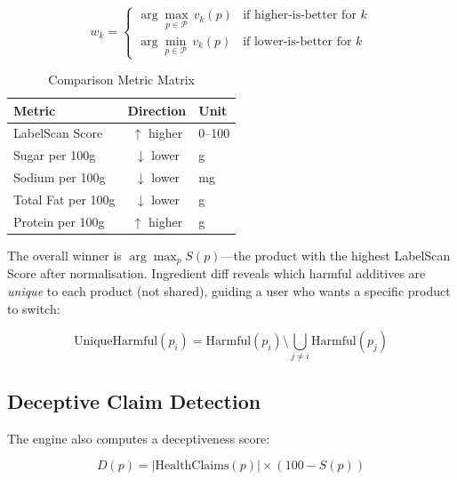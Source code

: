 \documentclass[conference]{IEEEtran}
\begin{document}
\begin{equation}
w_k = \begin{cases}
\arg\max_{p \in \mathcal{P}}\, v_k(p) & \text{if higher-is-better for } k \\
\arg\min_{p \in \mathcal{P}}\, v_k(p) & \text{if lower-is-better for } k
\end{cases}
\label{eq:winner}
\end{equation}

\begin{table}[ht]
\caption{Comparison Metric Matrix}
\label{tab:compare}
\begin{center}
\footnotesize
\begin{tabular}{|l|c|l|}
\hline
\textbf{Metric} & \textbf{Direction} & \textbf{Unit} \\
\hline
LabelScan Score     & $\uparrow$ higher & 0--100 \\
Sugar per 100g      & $\downarrow$ lower & g \\
Sodium per 100g     & $\downarrow$ lower & mg \\
Total Fat per 100g  & $\downarrow$ lower & g \\
Protein per 100g    & $\uparrow$ higher & g \\
\hline
\end{tabular}
\end{center}
\end{table}

The overall winner is $\arg\max_{p} S(p)$---the product with the highest
LabelScan Score after normalisation. Ingredient diff reveals which harmful
additives are \textit{unique} to each product (not shared), guiding
a user who wants a specific product to switch:

\begin{equation}
\text{UniqueHarmful}(p_i) = \text{Harmful}(p_i) \setminus \bigcup_{j \neq i} \text{Harmful}(p_j)
\label{eq:diff}
\end{equation}

\subsection{Deceptive Claim Detection}

The engine also computes a deceptiveness score:

\begin{equation}
D(p) = |\text{HealthClaims}(p)| \times (100 - S(p))
\label{eq:deceive}
\end{equation}
\end{document}
